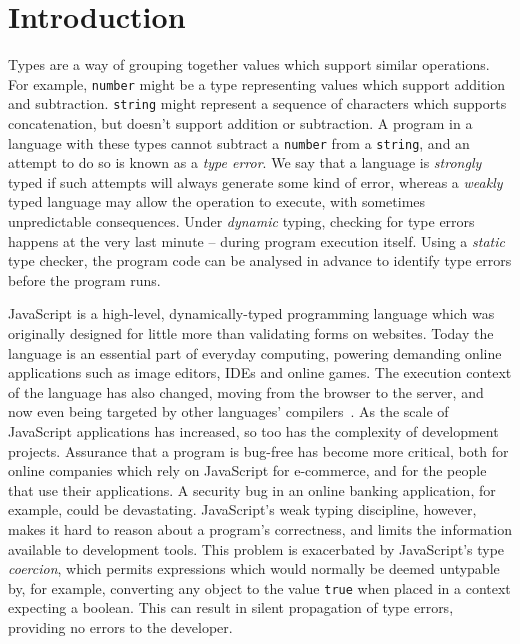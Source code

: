 \documentclass[12pt,a4paper,twoside,openright]{report}
\newcommand*{\js}{\texttt}
\begin{document}
\chapter{Introduction}\label{introduction}

Types are a way of grouping together values which support similar operations.
For example, \texttt{number} might be a type representing values which support
addition and subtraction. \texttt{string} might represent a sequence of
characters which supports concatenation, but doesn't support addition or
subtraction. A program in a language with these types cannot subtract a
\texttt{number} from a \texttt{string}, and an attempt to do so is known as a
\textit{type error}. We say that a language is \textit{strongly} typed if such
attempts will always generate some kind of error, whereas a \textit{weakly}
typed language may allow the operation to execute, with sometimes
unpredictable consequences. Under \textit{dynamic} typing, checking for type
errors happens at the very last minute -- during program execution itself.
Using a \textit{static} type checker, the program code can be analysed in
advance to identify type errors before the program runs.

JavaScript is a high-level, dynamically-typed programming language which was
originally designed for little more than validating forms on websites. Today
the language is an essential part of everyday computing, powering demanding
online applications such as image editors, IDEs and online games. The
execution context of the language has also changed, moving from the browser to
the server, and now even being targeted by other languages'
compilers~\cite{asm}. As the scale of JavaScript applications has increased,
so too has the complexity of development projects. Assurance that a program is
bug-free has become more critical, both for online companies which rely on
JavaScript for e-commerce, and for the people that use their applications. A
security bug in an online banking application, for example, could be
devastating. JavaScript's weak typing discipline, however, makes it hard to
reason about a program's correctness, and limits the information available to
development tools. This problem is exacerbated by JavaScript's type
\textit{coercion}, which permits expressions which would normally be deemed
untypable by, for example, converting any object to the value \js{true} when
placed in a context expecting a boolean. This can result in silent propagation
of type errors, providing no errors to the developer.
\end{document}
